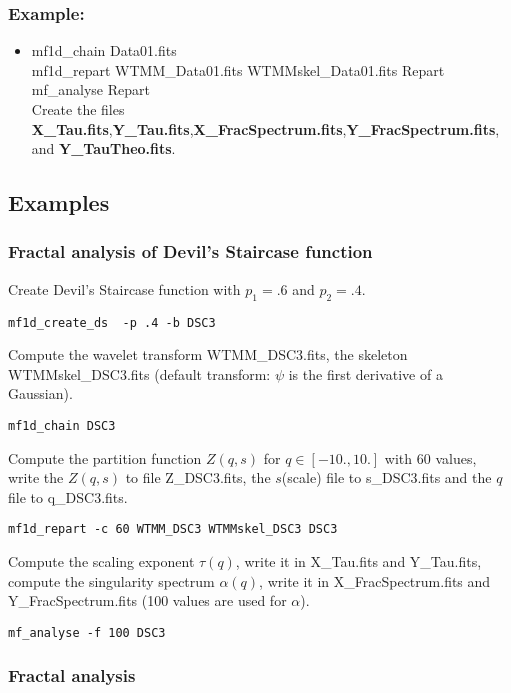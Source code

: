 \subsubsection*{Example:}
\begin{itemize}
\item mf1d\_chain Data01.fits \\
      mf1d\_repart WTMM\_Data01.fits WTMMskel\_Data01.fits Repart  \\
      mf\_analyse  Repart \\
  Create the files  {\bf X\_Tau.fits},{\bf Y\_Tau.fits},{\bf X\_FracSpectrum.fits},{\bf Y\_FracSpectrum.fits},
  and {\bf Y\_TauTheo.fits}.
\end{itemize}


\subsection{Examples}

\subsubsection*{Fractal analysis of Devil's Staircase function}
Create Devil's Staircase function with $p_1=.6$ and $p_2=.4$.
\begin{verbatim}
mf1d_create_ds  -p .4 -b DSC3
\end{verbatim}
Compute the wavelet transform WTMM\_DSC3.fits, the skeleton WTMMskel\_DSC3.fits
(default transform: $\psi$ is the first derivative of a Gaussian).
\begin{verbatim}
mf1d_chain DSC3
\end{verbatim}
Compute the partition function $Z(q,s)$ for $q\in[-10.,10.]$ with 60 values,
write the $Z(q,s)$ to file Z\_DSC3.fits, the $s$(scale) file to s\_DSC3.fits and the
$q$ file to q\_DSC3.fits.
\begin{verbatim}
mf1d_repart -c 60 WTMM_DSC3 WTMMskel_DSC3 DSC3
\end{verbatim}
Compute the scaling exponent $\tau(q)$, write it in X\_Tau.fits and Y\_Tau.fits,
compute the singularity spectrum $\alpha(q)$, write it in X\_FracSpectrum.fits
and Y\_FracSpectrum.fits (100 values are used for $\alpha$).
\begin{verbatim}
mf_analyse -f 100 DSC3
\end{verbatim}

\subsubsection*{Fractal analysis}


